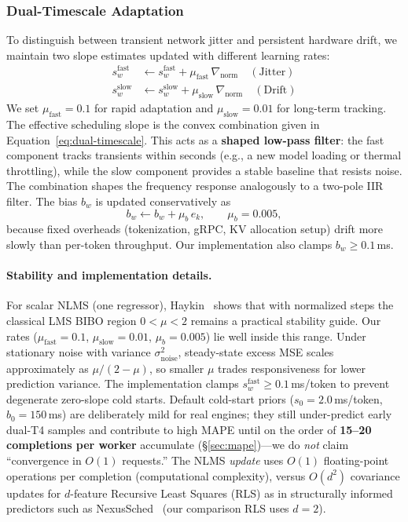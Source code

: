 \documentclass[10pt,twocolumn,letterpaper]{article}
\begin{document}
\subsubsection{Dual-Timescale Adaptation}
To distinguish between transient network jitter and persistent hardware drift, we maintain two slope estimates updated with different learning rates:
\begin{align}
    s^{\text{fast}}_w &\leftarrow s^{\text{fast}}_w + \mu_{\text{fast}} \,\nabla_{\text{norm}} \quad (\text{Jitter}) \\
    s^{\text{slow}}_w &\leftarrow s^{\text{slow}}_w + \mu_{\text{slow}} \,\nabla_{\text{norm}} \quad (\text{Drift})
\end{align}
We set $\mu_{\text{fast}} = 0.1$ for rapid adaptation and $\mu_{\text{slow}} = 0.01$ for long-term tracking. The effective scheduling slope is the convex combination given in Equation~\ref{eq:dual-timescale}.
This acts as a \textbf{shaped low-pass filter}: the fast component tracks transients within seconds (e.g., a new model loading or thermal throttling), while the slow component provides a stable baseline that resists noise. The combination shapes the frequency response analogously to a two-pole IIR filter. The bias $b_w$ is updated conservatively as
\begin{equation}
    b_w \leftarrow b_w + \mu_b \, e_k, \qquad \mu_b = 0.005,
\end{equation}
because fixed overheads (tokenization, gRPC, KV allocation setup) drift more slowly than per-token throughput. Our implementation also clamps $b_w \ge 0.1$\,ms.

\paragraph{Stability and implementation details.}
For scalar NLMS (one regressor), Haykin~\cite{haykin2002adaptive} shows that with normalized steps the classical LMS BIBO region $0 < \mu < 2$ remains a practical stability guide. Our rates ($\mu_{\text{fast}}{=}0.1$, $\mu_{\text{slow}}{=}0.01$, $\mu_b{=}0.005$) lie well inside this range. Under stationary noise with variance $\sigma^2_{\text{noise}}$, steady-state excess MSE scales approximately as $\mu/(2{-}\mu)$, so smaller $\mu$ trades responsiveness for lower prediction variance.
The implementation clamps $s^{\text{fast}}_w \geq 0.1$\,ms/token to prevent degenerate zero-slope cold starts. Default cold-start priors ($s_0{=}2.0$\,ms/token, $b_0{=}150$\,ms) are deliberately mild for real engines; they still under-predict early dual-T4 samples and contribute to high MAPE until on the order of \textbf{15--20 completions per worker} accumulate (\S\ref{sec:mape})---we do \emph{not} claim ``convergence in $O(1)$ requests.'' The NLMS \emph{update} uses $O(1)$ floating-point operations per completion (computational complexity), versus $O(d^2)$ covariance updates for $d$-feature Recursive Least Squares (RLS) as in structurally informed predictors such as NexusSched~\cite{nexussched} (our comparison RLS uses $d{=}2$).
\end{document}
